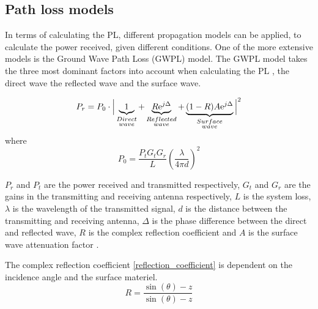 \subsection{Path loss models}

In terms of calculating the PL, different propagation models can be applied, to calculate the power received, given different conditions. One of the more extensive models is the Ground Wave Path Loss (GWPL) model. The GWPL model takes the three most dominant factors into account when calculating the PL \cite{Chong,Bullington}, the direct wave the reflected wave and the surface wave.  


\begin{equation}
P_r=P_0 \cdot \Big|\underbrace{1}_{\begin{subarray}{c}Direct\\wave\end{subarray}}+\underbrace{R\text{e}^{j\Delta}}_{\begin{subarray}{c}Reflected\\wave\end{subarray}}+\underbrace{(1-R)A\text{e}^{j\Delta}}_{\begin{subarray}{c}Surface\\wave\end{subarray}}\Big|^2 
\label{ground_wave}
\end{equation}
where
\begin{equation}
P_0 = \frac{P_t G_t G_r}{L} \left(\frac{\lambda}{4 \pi d}\right)^2 
\label{ground_wave_P0}
\end{equation}

$P_{r}$ and $P_{t}$ are the power received and transmitted respectively, $G_t$ and $G_r$ are the gains in the transmitting and receiving antenna respectively, $L$ is the system loss, $\lambda$ is the wavelength of the transmitted signal, $d$ is the distance between the transmitting and receiving antenna, $\Delta$ is the phase difference between the direct and reflected wave, $R$ is the complex reflection coefficient and $A$ is the surface wave attenuation factor \cite{Chong,Bullington}. 


The complex reflection coefficient \eqref{reflection_coefficient} is dependent on the incidence angle and the surface materiel.
\begin{equation}
R = \frac{\sin(\theta)-z}{\sin(\theta)-z}
\label{reflection_coefficient}
\end{equation}

